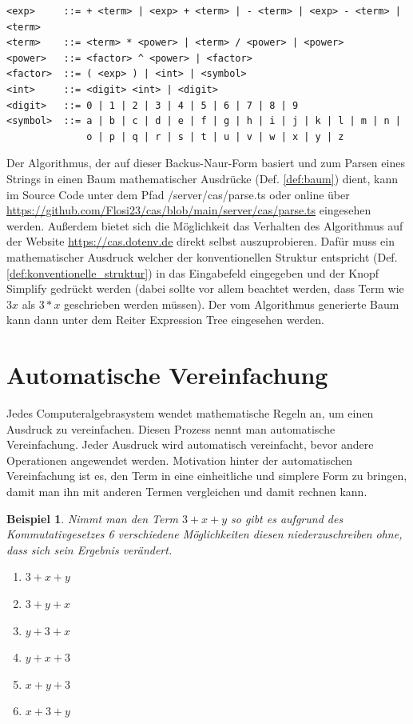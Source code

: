 \documentclass[11pt]{article}
\newcommand{\lab}[1]{(Def. \ref{#1})}
\newtheorem{example}{Beispiel}
\begin{document}
\begin{verbatim}
<exp>     ::= + <term> | <exp> + <term> | - <term> | <exp> - <term> | <term> 
<term>    ::= <term> * <power> | <term> / <power> | <power>
<power>   ::= <factor> ^ <power> | <factor>
<factor>  ::= ( <exp> ) | <int> | <symbol> 
<int>     ::= <digit> <int> | <digit>
<digit>   ::= 0 | 1 | 2 | 3 | 4 | 5 | 6 | 7 | 8 | 9 
<symbol>  ::= a | b | c | d | e | f | g | h | i | j | k | l | m | n | 
              o | p | q | r | s | t | u | v | w | x | y | z
\end{verbatim}

Der Algorithmus, der auf dieser Backus-Naur-Form basiert und zum Parsen eines Strings in einen
Baum mathematischer Ausdrücke \lab{def:baum} dient, kann im Source Code unter dem Pfad /server/cas/parse.ts 
oder online über \url{https://github.com/Flosi23/cas/blob/main/server/cas/parse.ts} eingesehen werden. \newline
Außerdem bietet sich die Möglichkeit das Verhalten des Algorithmus auf der Website  \url{https://cas.dotenv.de}
direkt selbst auszuprobieren. Dafür muss ein mathematischer Ausdruck welcher der konventionellen Struktur 
entspricht \lab{def:konventionelle_struktur}
in das Eingabefeld eingegeben und der Knopf \glqq Simplify\grqq{}  gedrückt werden
(dabei sollte vor allem beachtet werden, dass Term wie $3x$ als $3*x$ geschrieben werden müssen).
Der vom Algorithmus generierte Baum kann dann unter dem Reiter \glqq Expression Tree\grqq{} eingesehen werden.

\section{Automatische Vereinfachung}

Jedes Computeralgebrasystem wendet mathematische Regeln an, um einen Ausdruck zu vereinfachen. 
Diesen Prozess nennt man automatische Vereinfachung. 
Jeder Ausdruck wird automatisch vereinfacht, bevor andere Operationen angewendet werden. 
Motivation hinter der automatischen Vereinfachung ist es, den Term in eine einheitliche und simplere Form zu bringen, 
damit man ihn mit anderen Termen vergleichen und damit rechnen kann. 

\begin{example} \normalfont
Nimmt man den Term $3+x+y$ so gibt es aufgrund des Kommutativgesetzes 6 verschiedene Möglichkeiten diesen
niederzuschreiben ohne, dass sich sein Ergebnis verändert.
\begin{enumerate}
  \item $3+x+y$
  \item $3+y+x$
  \item $y+3+x$
  \item $y+x+3$
  \item $x+y+3$
  \item $x+3+y$
\end{enumerate}
\end{example}
\end{document}
